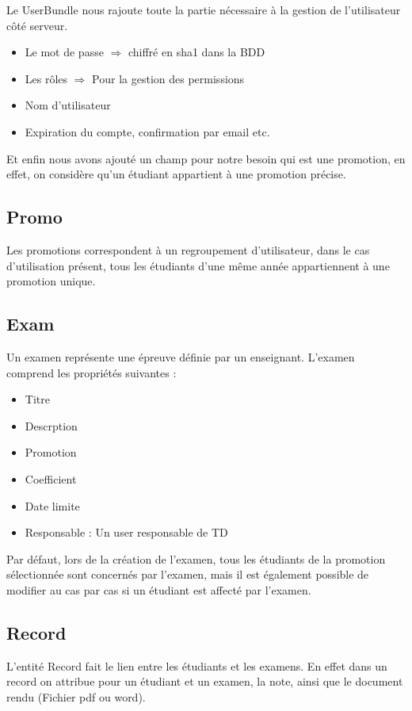 \documentclass{report}
\begin{document}
      Le UserBundle nous rajoute toute la partie nécessaire à la gestion de
      l'utilisateur côté serveur.
      \begin{itemize}
        \item{Le mot de passe $\Rightarrow$ chiffré en sha1 dans la BDD}
        \item{Les rôles $\Rightarrow$ Pour la gestion des permissions}
        \item{Nom d'utilisateur}
        \item{Expiration du compte, confirmation par email etc.}
      \end{itemize}

      Et enfin nous avons ajouté un champ pour notre besoin qui est une
      promotion, en effet, on considère qu'un étudiant appartient à une
      promotion précise.

    \subsection{Promo}
      Les promotions correspondent à un regroupement d'utilisateur, dans le cas d'utilisation présent, tous les étudiants d'une même année 
      appartiennent à une promotion unique.

    \subsection{Exam}
      Un examen représente une épreuve définie par un enseignant. L'examen 
			comprend les propriétés suivantes :
			\begin{itemize}
				\item{Titre}
				\item{Descrption}
				\item{Promotion}
				\item{Coefficient}
				\item{Date limite}
				\item{Responsable : Un user responsable de TD}
			\end{itemize}
			Par défaut, lors de la création de l'examen, tous les étudiants de la promotion sélectionnée sont concernés par l'examen, mais il est également possible de modifier au cas par cas si un étudiant est affecté par l'examen.
    \subsection{Record}
			L'entité Record fait le lien entre les étudiants et les examens. En effet dans un record on attribue pour un étudiant et un examen, la note, ainsi que le document rendu (Fichier pdf ou word).
\end{document}
